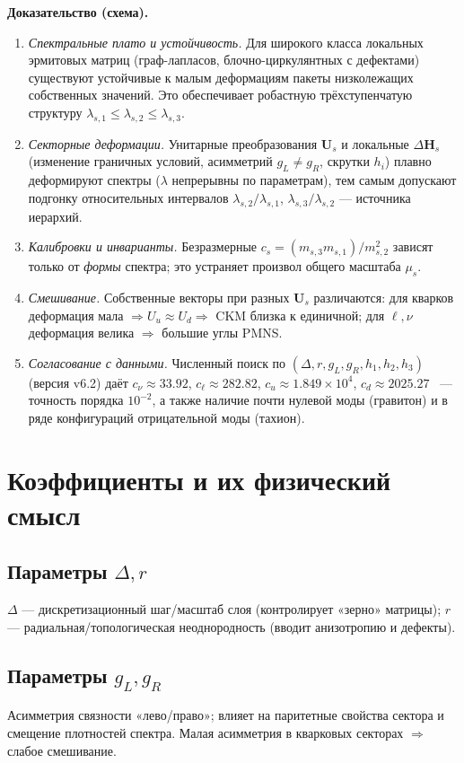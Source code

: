 \documentclass[12pt,a4paper]{article}
\theoremstyle{definition}
\theoremstyle{plain}
\theoremstyle{remark}
\newcommand{\Hs}{\mathbf{H}_{s}}
\newcommand{\U}{\mathbf{U}}
\begin{document}
\noindent\textbf{Доказательство (схема).}
\begin{enumerate}[leftmargin=0.9cm]
  \item \textit{Спектральные плато и устойчивость.} Для широкого класса локальных эрмитовых матриц (граф-лапласов, блочно-циркулянтных с дефектами) существуют устойчивые к малым деформациям пакеты низколежащих собственных значений. Это обеспечивает робастную трёхступенчатую структуру \(\lambda_{s,1}\le\lambda_{s,2}\le\lambda_{s,3}\).
  \item \textit{Секторные деформации.} Унитарные преобразования \(\U_s\) и локальные \(\Delta\Hs\) (изменение граничных условий, асимметрий \(g_L\neq g_R\), скрутки \(h_i\)) плавно деформируют спектры (\(\lambda\) непрерывны по параметрам), тем самым допускают подгонку относительных интервалов \(\lambda_{s,2}/\lambda_{s,1}\), \(\lambda_{s,3}/\lambda_{s,2}\) --- источника иерархий.
  \item \textit{Калибровки и инварианты.} Безразмерные \(c_s=(m_{s,3}m_{s,1})/m_{s,2}^2\) зависят только от \emph{формы} спектра; это устраняет произвол общего масштаба \(\mu_s\).
  \item \textit{Смешивание.} Собственные векторы при разных \(\U_s\) различаются: для кварков деформация мала \(\Rightarrow U_u\approx U_d\Rightarrow\) CKM близка к единичной; для \(\ell,\nu\) деформация велика \(\Rightarrow\) большие углы PMNS.
  \item \textit{Согласование с данными.} Численный поиск по \((\Delta,r,g_L,g_R,h_1,h_2,h_3)\) (версия v6.2) даёт \(c_\nu\approx 33.92\), \(c_\ell\approx 282.82\), \(c_u\approx 1.849\times 10^4\), \(c_d\approx 2025.27\) ~--- точность порядка \(10^{-2}\), а также наличие почти нулевой моды (гравитон) и в ряде конфигураций отрицательной моды (тахион). \qedhere
\end{enumerate}

\section{Коэффициенты и их физический смысл}
\subsection*{Параметры \(\Delta,r\)}
\(\Delta\) --- дискретизационный шаг/масштаб слоя (контролирует «зерно» матрицы); \(r\) --- радиальная/топологическая неоднородность (вводит анизотропию и дефекты).

\subsection*{Параметры \(g_L,g_R\)}
Асимметрия связности «лево/право»; влияет на паритетные свойства сектора и смещение плотностей спектра. Малая асимметрия в кварковых секторах \(\Rightarrow\) слабое смешивание.
\end{document}
